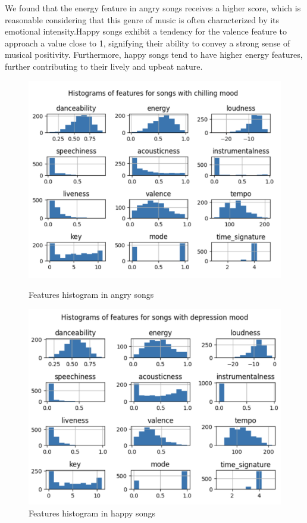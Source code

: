 \documentclass{article}
\begin{document}
We found that the energy feature in angry songs receives a higher score, which is reasonable considering that this genre of music is often characterized by its emotional intensity.Happy songs exhibit a tendency for the valence feature to approach a value close to 1, signifying their ability to convey a strong sense of musical positivity. Furthermore, happy songs tend to have higher energy features, further contributing to their lively and upbeat nature.

\begin{figure}[!htb]
   \begin{minipage}{0.48\textwidth}
     \centering
     \includegraphics[scale=0.4]{ chill.png}
     \caption{Features histogram in angry songs}\label{Fig:Data1}
   \end{minipage}\hfill
   \begin{minipage}{0.48\textwidth}
     \centering
     \includegraphics[scale=0.4]{despression.png}
     \caption{Features histogram in happy songs}\label{Fig:Data2}
   \end{minipage}
\end{figure}
\end{document}

